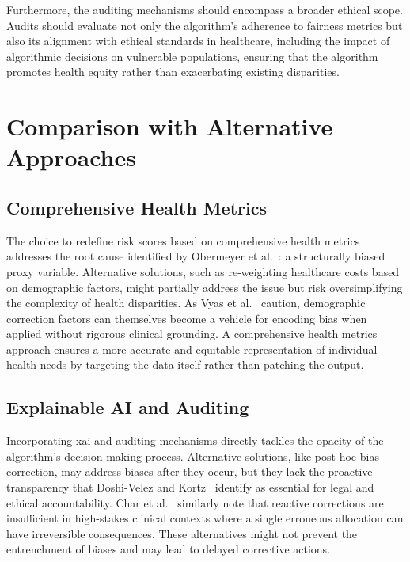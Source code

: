 \documentclass[11pt,showkeys]{essay}
\begin{document}
Furthermore, the auditing mechanisms should encompass a broader ethical scope. Audits should evaluate not only the algorithm's adherence to fairness metrics but also its alignment with ethical standards in healthcare, including the impact of algorithmic decisions on vulnerable populations, ensuring that the algorithm promotes health equity rather than exacerbating existing disparities.

\section{Comparison with Alternative Approaches}

\subsection{Comprehensive Health Metrics}

The choice to redefine risk scores based on comprehensive health metrics addresses the root cause identified by Obermeyer et al.~\cite{obermeyer_dissecting_2019}: a structurally biased proxy variable. Alternative solutions, such as re-weighting healthcare costs based on demographic factors, might partially address the issue but risk oversimplifying the complexity of health disparities. As Vyas et al.~\cite{vyas_hidden_2020} caution, demographic correction factors can themselves become a vehicle for encoding bias when applied without rigorous clinical grounding. A comprehensive health metrics approach ensures a more accurate and equitable representation of individual health needs by targeting the data itself rather than patching the output.

\subsection{Explainable AI and Auditing}

Incorporating \gls{xai} and auditing mechanisms directly tackles the opacity of the algorithm's decision-making process. Alternative solutions, like post-hoc bias correction, may address biases after they occur, but they lack the proactive transparency that Doshi-Velez and Kortz~\cite{doshi-velez_accountability_2017} identify as essential for legal and ethical accountability. Char et al.~\cite{char_implementing_2018} similarly note that reactive corrections are insufficient in high-stakes clinical contexts where a single erroneous allocation can have irreversible consequences. These alternatives might not prevent the entrenchment of biases and may lead to delayed corrective actions.
\end{document}
